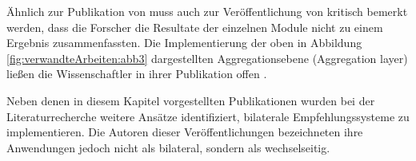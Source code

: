 Ähnlich zur Publikation von \textcite[S. 3ff.]{malinowski:2006} muss auch zur Veröffentlichung von \textcite[S. 5ff.]{keim:2007} kritisch bemerkt werden, dass die Forscher die Resultate der einzelnen Module nicht zu einem Ergebnis zusammenfassten. Die Implementierung der oben in Abbildung \ref{fig:verwandteArbeiten:abb3} dargestellten Aggregationsebene (Aggregation layer) ließen die Wissenschaftler in ihrer Publikation offen \cite[S. 8]{keim:2007}.

Neben denen in diesem Kapitel vorgestellten Publikationen wurden bei der Literaturrecherche weitere Ansätze identifiziert, bilaterale Empfehlungssysteme zu implementieren. Die Autoren dieser Veröffentlichungen bezeichneten ihre Anwendungen jedoch nicht als bilateral, sondern als wechselseitig. %

